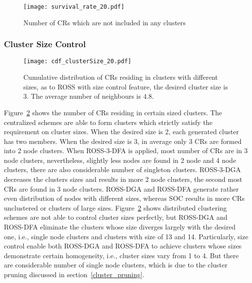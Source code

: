 \documentclass[journal,comsoc]{IEEEtran}
\theoremstyle{mytheoremstyle}
\theoremstyle{mytheoremstyle}
\theoremstyle{mytheoremstyle}
\newcommand{\ie}{i.e., }
\begin{document}
\begin{figure}[h]
  \centering
  \texttt{[image: survival\_rate\_20.pdf]}
  \caption{Number of CRs which are not included in any clusters}
  \label{singleton_clusters}
\end{figure}



\subsubsection{Cluster Size Control}
\label{cluster_size}
\begin{figure}[h]
  \centering
  \texttt{[image: cdf\_clusterSize\_20.pdf]}
  \caption{Cumulative distribution of CRs residing in clusters with different sizes, as to ROSS with size control feature, the desired cluster size is 3. The average number of neighbours is 4.8.}
  \label{size_control}
\end{figure}
Figure~\ref{size_control} shows the number of CRs residing in certain sized clusters.
The centralized schemes are able to form clusters which strictly satisfy the requirement on cluster sizes.
When the desired size is 2, each generated cluster has two members.
When the desired size is 3, in average only 3 CRs are formed into 2 node clusters.
When ROSS-3-DFA is applied, most number of CRs are in 3 node clusters, nevertheless, slightly less nodes are found in 2 node and 4 node clusters, there are also considerable number of singleton clusters.
ROSS-3-DGA decreases the clusters sizes and results in more 2 node clusters, the second most CRs are found in 3 node clusters.
ROSS-DGA and ROSS-DFA generate rather even distribution of nodes with different sizes, whereas SOC results in more CRs unclustered or clusters of large sizes. 
Figure~\ref{size_control} shows distributed clustering schemes are not able to control cluster sizes perfectly, but ROSS-DGA and ROSS-DFA eliminate the clusters whose size diverges largely with the desired one, \ie single node clusters and clusters with size of 13 and 14.
Particularly, size control enable both ROSS-DGA and ROSS-DFA to achieve clusters whose sizes demonstrate certain homogeneity, \ie cluster sizes vary from 1 to 4.
But there are considerable number of single node clusters, which is due to the cluster pruning discussed in section~\ref{cluster_pruning}.
\end{document}
